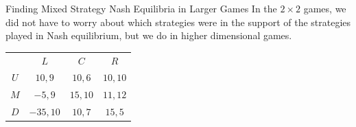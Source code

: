 \documentclass[10pt]{extarticle}
\begin{document}
  \begin{problem}{Finding Mixed Strategy Nash Equilibria in Larger Games}
    In the $2\times 2$ games, we did not have to worry about which strategies were in the support of the strategies played in Nash equilibrium, but we do in higher dimensional games.
    \begin{center}
      \renewcommand{\arraystretch}{1.5}
      \begin{tabular}{c|c|c|c|}
        \multicolumn{1}{c}{} & \multicolumn{1}{c}{$L$} & \multicolumn{1}{c}{$C$} & \multicolumn{1}{c}{$R$}\\
        \cline{2-4}
        $U$ & $10,9$ & $10,6$ & $10,10$ \\
        \cline{2-4}
        $M$ & $-5,9$ & $15,10$ & $11,12$\\
        \cline{2-4}
        $D$ & $-35,10$ & $10,7$ & $15,5$\\
        \cline{2-4}
      \end{tabular}
    \end{center}
  \end{problem}
\end{document}
